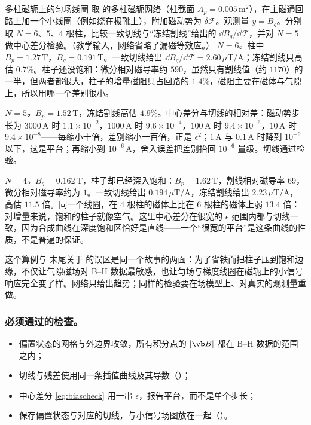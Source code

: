 \begin{example}[label=ex:projects-p3]{多柱磁轭上的匀场线圈}
取 的多柱磁轭网络（柱截面 $A_p=0.005\,\mathrm{m^2}$），在主磁通回路上加一个小线圈（例如绕在极靴上），附加磁动势为 $\delta\mathcal F$。观测量 $y=B_g$。分别取 $N=6$、$5$、$4$ 根柱，比较一致切线与“冻结割线”给出的 $\dd B_g/\dd\mathcal F$，并对 $N=5$ 做中心差分检验。（教学输入，网络省略了漏磁等效应。）
\solution
\emph{$N=6$。}柱中 $B_p=1.27\,\mathrm T$，$B_g=0.191\,\mathrm T$。一致切线给出 $\dd B_g/\dd\mathcal F=2.60\,\mu\mathrm T/\mathrm A$；冻结割线只高估 $0.7\%$。柱子还没饱和：微分相对磁导率约 $590$，虽然只有割线值（约 $1170$）的一半，但两者都很大，柱子的增量磁阻只占回路的 $1.4\%$，磁阻主要在磁体与气隙上，所以用哪一个差别很小。

\emph{$N=5$。}$B_p=1.52\,\mathrm T$，冻结割线高估 $4.9\%$。中心差分与切线的相对差：磁动势步长为 $3000\,\mathrm A$ 时 $1.1\times10^{-2}$，$1000\,\mathrm A$ 时 $9.6\times10^{-4}$，$100\,\mathrm A$ 时 $9.4\times10^{-6}$，$10\,\mathrm A$ 时 $9.4\times10^{-8}$——每缩小十倍，差别缩小一百倍，正是 $\epsilon^2$；$1\,\mathrm A$ 与 $0.1\,\mathrm A$ 时降到 $10^{-9}$ 以下，这是平台；再缩小到 $10^{-6}\,\mathrm A$，舍入误差把差别抬回 $10^{-6}$ 量级。切线通过检验。

\emph{$N=4$。}$B_g=0.162\,\mathrm T$，柱子却已经深入饱和：$B_p=1.62\,\mathrm T$，割线相对磁导率 $69$，微分相对磁导率约为 $1$。一致切线给出 $0.194\,\mu\mathrm T/\mathrm A$，冻结割线给出 $2.23\,\mu\mathrm T/\mathrm A$，高估 $11.5$ 倍。同一个线圈，在 $4$ 根柱的磁体上比在 $6$ 根柱的磁体上弱 $13.4$ 倍：对增量来说，饱和的柱子就像空气。这里中心差分在很宽的 $\epsilon$ 范围内都与切线一致，因为合成曲线在深度饱和区恰好是直线——一个“很宽的平台”是这条曲线的性质，不是普遍的保证。
\end{example}

这个算例与 末尾关于 的误区是同一个故事的两面：为了省铁而把柱子压到饱和边缘，不仅让气隙磁场对 B--H 数据最敏感，也让匀场与梯度线圈在磁轭上的小信号响应完全变了样。网络只给出趋势；同样的检验要在场模型上、对真实的观测量重做。

\subsubsection{必须通过的检查。}
\begin{itemize}[label=$\mdlgwhtsquare$]
\item 偏置状态的网格与外边界收敛，所有积分点的 $|\vb B|$ 都在 B--H 数据的范围之内；
\item 切线与残差使用同一条插值曲线及其导数（）；
\item 中心差分 \eqref{eq:biascheck} 用一串 $\epsilon$，报告平台，而不是单个步长；
\item 保存偏置状态与对应的切线，与小信号场图放在一起（）。
\end{itemize}


